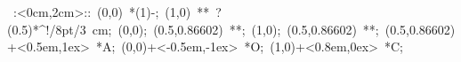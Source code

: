 %


\hbox{
\xy    <2cm,0cm>:<0cm,2cm>::
       (0,0) *\ellipse(1){-}; 
       (1,0) **\dir{-} ?(0.5)*^!/8pt/\hbox{3 cm};
       (0,0); (0.5,0.86602) **\dir{-};
       (1,0); (0.5,0.86602) **\dir{-};
       (0.5,0.86602)+<0.5em,1ex> *{A};
       (0,0)+<-0.5em,-1ex> *{O};
       (1,0)+<0.8em,0ex> *{C};
\endxy}

